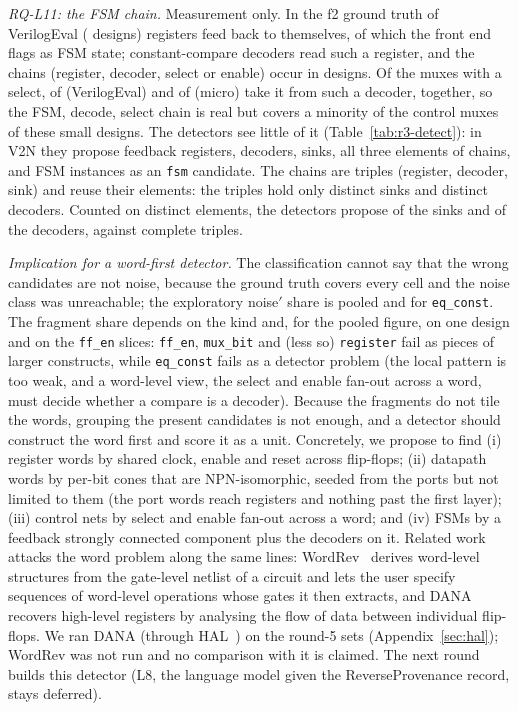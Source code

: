 \documentclass[conference]{IEEEtran}
\newcommand{\code}[1]{\texttt{#1}}
\begin{document}
\emph{RQ-L11: the FSM chain.} Measurement only. In the f2 ground truth of VerilogEval
(\rttElevenVeDesigns{} designs) \rttElevenVeFb{} registers feed back to themselves, of which
\rttElevenVeFsm{} the front end flags as FSM state; \rttElevenVeDec{} constant-compare decoders
read such a register, and the chains (register, decoder, select or enable) occur in
\rttElevenVeDesignsChain{} designs. Of the muxes with a select, \rttElevenVeMuxChain{} of
\rttElevenVeMuxS{} (VerilogEval) and \rttElevenMiMuxChain{} of \rttElevenMiMuxS{} (micro) take it from
such a decoder, \rttElevenMuxShare{} together, so the FSM, decode, select chain is real but covers a
minority of the control muxes of these small designs. The detectors see little of it
(Table~\ref{tab:r3-detect}): in V2N they propose \rttElevenVtwoNFb{} feedback registers,
\rttElevenVtwoNDec{} decoders, \rttElevenVtwoNSink{} sinks, all three elements of
\rttElevenVtwoNChain{} chains, and \rttElevenVtwoNFsm{} FSM instances as an \code{fsm} candidate.
The chains are triples (register, decoder, sink) and reuse their elements: the \rttElevenVeChains{}
triples hold only \rttElevenVeSinks{} distinct sinks and \rttElevenVeDec{} distinct decoders. Counted
on distinct elements, the detectors propose \rttElevenVtwoNSink{} of the sinks and
\rttElevenVtwoNDec{} of the decoders, against \rttElevenVtwoNChain{} complete triples.

\emph{Implication for a word-first detector.} The classification cannot say that the wrong
candidates are not noise, because the ground truth covers every cell and the noise class was
unreachable; the exploratory noise$'$ share is \rttNineNoisePrime{} pooled and \rttNineEqconstNoisePrime{} for
\code{eq\_const}. The fragment share depends on the kind and, for the pooled figure, on one design
and on the \code{ff\_en} slices: \code{ff\_en}, \code{mux\_bit} and
(less so) \code{register} fail as pieces of larger constructs, while \code{eq\_const} fails as
a detector problem (the local pattern is too weak, and a word-level view, the select and enable
fan-out across a word, must decide whether a compare is a decoder). Because the fragments do
not tile the words, grouping the present candidates is not enough, and a detector should
construct the word first and score it as a unit. Concretely, we propose to find (i) register words by shared clock, enable and reset
across flip-flops; (ii) datapath words by per-bit cones that are NPN-isomorphic, seeded from the
ports but not limited to them (the port words reach registers and nothing past the first
layer); (iii) control nets by select and enable fan-out across a word; and (iv) FSMs by a
feedback strongly connected component plus the decoders on it. Related work attacks the word
problem along the same lines: WordRev~\cite{li2013wordrev} derives word-level structures from
the gate-level netlist of a circuit and lets the user specify sequences of word-level operations
whose gates it then extracts, and DANA~\cite{albartus2020dana} recovers high-level registers by
analysing the flow of data between individual flip-flops. We ran DANA (through HAL~\cite{hal}) on the round-5 sets
(Appendix~\ref{sec:hal}); WordRev was not run and no comparison with it is claimed. The
next round builds this detector (L8, the language model given the ReverseProvenance record,
stays deferred).
\end{document}
